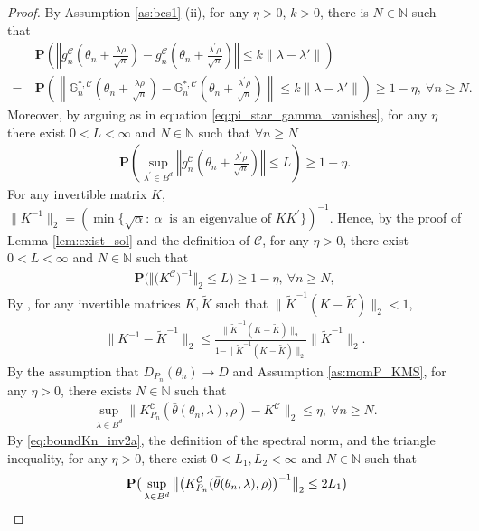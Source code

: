 \documentclass[letterpaper,11pt]{article}
\theoremstyle{myplain}
\theoremstyle{mydefinition}
\theoremstyle{myremark}
\renewcommand{\cite}{\citet}
\newcommand{\cC}{\mathcal{C}}
\newcommand{\tlarhon}{\tfrac{\lambda \rho }{\sqrt n}}
\numberwithin{equation}{section}
\numberwithin{figure}{section}
\begin{document}
\begin{appendices}
\begin{proof}
By Assumption \ref{as:bcs1} (ii), for any $\eta>0$, $k>0$, there is $N\in\mathbb N$ such that
\begin{align}
&~\mathbf P\left(\left\Vert g^{\cC}_{n}(\theta_{n}+\tlarhon)- g^{\cC}_{n}(\theta_{n}+\tfrac{\lambda^\prime \rho }{\sqrt{n}}) \right\Vert\le k\|\lambda-\lambda'\|\right) \\ 
=&~\mathbf P\left(\left\|\mathbb G^{*,{\cC}}_{n}(\theta_{n}+\tlarhon)-\mathbb G^{*,{\cC}}_{n}(\theta_{n}+\tfrac{\lambda^\prime \rho }{\sqrt{n}})\right\|\le k\|\lambda-\lambda'\|\right)\ge 1-\eta,~\forall n\ge N.\label{eq:g_gprimeOrootn}
\end{align}
Moreover, by arguing as in equation \eqref{eq:pi_star_gamma_vanishes}, for any $\eta$ there exist $0<L<\infty$ and $N\in\mathbb N$ such that $\forall n\ge N$
\begin{align}
\mathbf P\left(\sup_{\lambda^\prime \in B^d}\left\Vert g^{\cC}_{n}(\theta_{n}+\tfrac{\lambda^\prime \rho }{\sqrt{n}}) \right\Vert\le L\right) \ge 1-\eta.\label{eq:g_O1}
\end{align}
For any invertible matrix $K$, $\|K^{-1}\|_2=\left(\min \{\sqrt{\alpha}:~\alpha ~\text{ is an eigenvalue of } KK^\prime \}\right)^{-1}$.
Hence, by the proof of Lemma \ref{lem:exist_sol} and the definition of $\cC$, for any $\eta>0$, there exist $0<L<\infty$ and $N\in\mathbb N$ such that
\begin{align}
\mathbf P\big(\big\Vert \big(K^{\cC} \big)^{-1} \big\Vert_2 \le L \big)\ge  1-\eta,~\forall n\ge N,\label{eq:boundKn_inv2}
\end{align}
By \cite[ch. 5.8]{HornJohnson}, for any invertible matrices $K,\tilde K$ such that $\|\tilde K^{-1}(K-\tilde K)\|_2<1$, 
\begin{align}
	\| K^{-1}-\tilde K^{-1}\|_2\le \frac{\|\tilde K^{-1}(K-\tilde K)\|_2}{1-\|\tilde K^{-1}(K-\tilde K)\|_2}\|\tilde K^{-1}\|_2.
	\label{eq:boundKn_inv2a}
\end{align}
By the assumption that $D_{P_n}(\theta_n)\to D$ and Assumption \ref{as:momP_KMS}, for any $\eta>0$, there exists $N\in\mathbb N$ such that
\begin{align}
\sup_{\lambda\in B^d}\|K_{P_{n}}^{\cC}(\bar\theta(\theta_{n},\lambda),\rho )-K^{\cC}\|_2 \le \eta,~\forall n\ge N.
\end{align}  
By \eqref{eq:boundKn_inv2a}, the definition of the spectral norm, and the triangle inequality, for any $\eta>0$, there exist $0<L_1,L_2<\infty$ and $N\in\mathbb N$ such that
\begin{align}
&~\mathbf P \big(\sup_{\lambda\in B^d}\big\Vert \big(K_{P_{n}}^{\cC}(\bar\theta(\theta_{n},\lambda),\rho ) \big)^{-1} \big\Vert_2 \le 2L_1\big)\notag\\

\end{align}
\end{proof}
\end{appendices}
\end{document}
